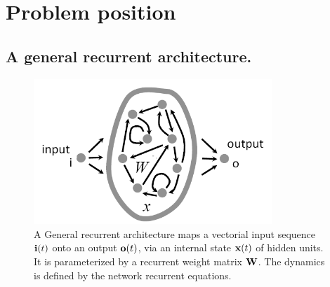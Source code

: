 \section*{Problem position}

\subsection*{A general recurrent architecture.}

\begin{figure}[!ht]
  \includegraphics[width=0.8\textwidth]{img/recurrent-network}
  \caption{A General recurrent architecture maps a vectorial input sequence ${\bf i}(t)$ onto an output ${\bf o}(t)$, 
    via an internal state ${\bf x}(t)$ of hidden units. It is parameterized by a recurrent weight matrix ${\bf W}$. 
    The dynamics is defined by the network recurrent equations.}
  \label{recurrent-network}
\end{figure}

